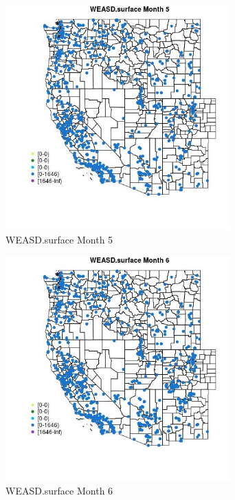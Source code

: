 \begin{figure} 
\centering  
\includegraphics[width=0.77\textwidth]{Code_Outputs/Report_ML_input_PM25_Step4_part_f_de_duplicated_aves_prioritize_24hr_obswNAs_MapObsMo5WEASDsurface.jpg} 
\caption{\label{fig:Report_ML_input_PM25_Step4_part_f_de_duplicated_aves_prioritize_24hr_obswNAsMapObsMo5WEASDsurface}WEASD.surface Month 5} 
\end{figure} 
 

\begin{figure} 
\centering  
\includegraphics[width=0.77\textwidth]{Code_Outputs/Report_ML_input_PM25_Step4_part_f_de_duplicated_aves_prioritize_24hr_obswNAs_MapObsMo6WEASDsurface.jpg} 
\caption{\label{fig:Report_ML_input_PM25_Step4_part_f_de_duplicated_aves_prioritize_24hr_obswNAsMapObsMo6WEASDsurface}WEASD.surface Month 6} 
\end{figure} 
 


